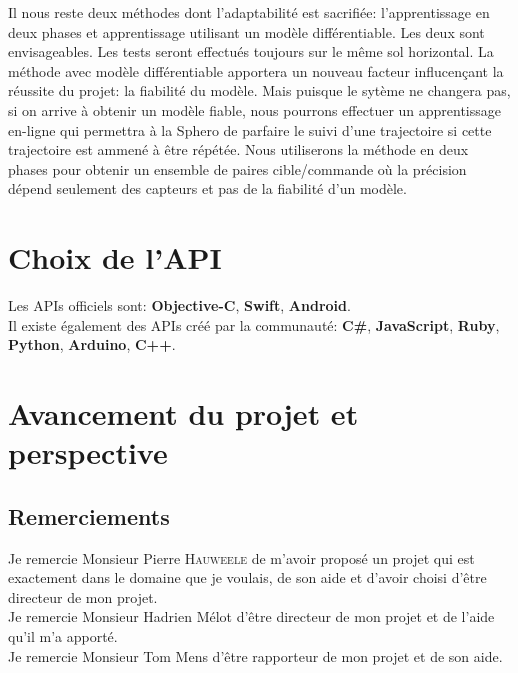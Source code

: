 \documentclass[12pt,a4paper,oneside, titlepage]{article}
\begin{document}
Il nous reste deux méthodes dont l'adaptabilité est sacrifiée: l'apprentissage en deux phases et apprentissage utilisant un modèle différentiable.
Les deux sont envisageables. Les tests seront effectués toujours sur le même sol horizontal.
La méthode avec modèle différentiable apportera un nouveau facteur influcençant la réussite du projet: la fiabilité du modèle.
Mais puisque le sytème ne changera pas, si on arrive à obtenir un modèle fiable, nous pourrons effectuer un apprentissage en-ligne qui permettra à la Sphero de parfaire le suivi d'une trajectoire si cette trajectoire est ammené à être répétée.
Nous utiliserons la méthode en deux phases pour obtenir un ensemble de paires cible/commande où la précision dépend seulement des capteurs et pas de la fiabilité d'un modèle.

\section{Choix de l'API}
Les APIs officiels sont:\cite{SDKofficiels} \textbf{Objective-C}, \textbf{Swift}, \textbf{Android}.\\
Il existe également des APIs créé par la communauté:\cite{gosphero} \textbf{C\#}, \textbf{JavaScript}, \textbf{Ruby}, \textbf{Python}\cite{pythonAPI}, \textbf{Arduino}, \textbf{C++}\cite{cppAPI}.\\
\section{Avancement du projet et perspective}
\subsection*{Remerciements}
\noindent Je remercie Monsieur Pierre \textsc{Hauweele} de m'avoir proposé un projet qui est exactement dans le domaine que je voulais, de son aide et d'avoir choisi d'être directeur de mon projet.\\

\noindent Je remercie Monsieur Hadrien Mélot d'être directeur de mon projet et de l'aide qu'il m'a apporté.\\

\noindent Je remercie Monsieur Tom Mens d'être rapporteur de mon projet et de son aide.\\


\appendix
\end{document}
